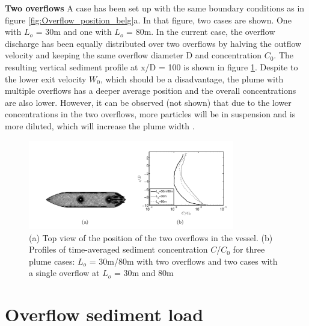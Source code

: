 \noindent \textbf{Two overflows} \newline
\noindent A case has been set up with the same boundary conditions as in figure \ref{fig:Overflow_position_belg}a. In that figure, two cases are shown. One with $L_o$ = 30m and one with $L_o$ = 80m. In the current case, the overflow discharge has been equally distributed over two overflows by halving the outflow velocity and keeping the same overflow diameter D and concentration $C_0$. The resulting vertical sediment profile at x/D = 100 is shown in figure \ref{fig:Multiple_overflows}. Despite to the lower exit velocity $W_0$, which should be a disadvantage, the plume with multiple overflows has a deeper average position and the overall concentrations are also lower. However, it can be observed (not shown) that due to the lower concentrations in the two overflows, more particles will be in suspension and is more diluted, which will increase the plume width \citep{Decrop}.

\begin{figure}[ht!]
    \centering
    \includegraphics[width = 0.8\textwidth]{Images/Multiple_overflows.png}
    \caption{(a) Top view of the position of the two overflows in the vessel. (b) Profiles of time-averaged sediment concentration $C$/$C_0$ for three plume cases: $L_o$ = 30m/80m with two overflows and two cases with a single overflow at $L_o$ = 30m and 80m}
    \label{fig:Multiple_overflows}
\end{figure}






\newpage
\section{Overflow sediment load}


